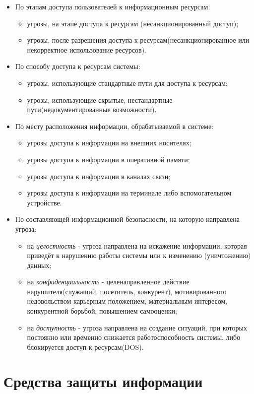 \documentclass{article}
\begin{document}
\begin{itemize}
\begin{itemize}
\end{itemize}
\item По этапам доступа пользователей к информационным ресурсам:
\begin{itemize}
\item угрозы, на этапе доступа к ресурсам (несанкционированный доступ);
\item угрозы, после разрешения доступа к ресурсам(несанкционированное или некорректное использование ресурсов).
\end{itemize}
\item По способу доступа к ресурсам системы:
\begin{itemize}
\item угрозы, использующие стандартные пути для доступа к ресурсам;
\item угрозы, использующие скрытые, нестандартные пути(недокументированные возможности).
\end{itemize}
\item По месту расположения информации, обрабатываемой в системе:
\begin{itemize}
\item угрозы доступа к информации на внешних носителях;
\item угрозы доступа к информации в оперативной памяти;
\item угрозы доступа к информации в каналах связи;
\item угрозы доступа к информации на терминале либо вспомогательном устройстве.
\end{itemize}
\item По составляющей информационной безопасности, на которую направлена угроза:
\begin{itemize}
\item на \textit{целостность} - угроза направлена на искажение информации, которая приведёт к нарушению работы системы или к изменению (уничтожению) данных;
\item на \textit{конфиденциальность} - целенаправленное действие нарушителя(служащий, посетитель, конкурент), мотивированного недовольством карьерным положением, материальным интересом, конкурентной борьбой, повышением самооценки;
\item на \textit{доступность} - угроза направлена на создание ситуаций, при которых постоянно или временно снижается работоспособность системы, либо блокируется доступ к ресурсам(DOS).
\end{itemize}
\end{itemize}
\section{ Средства защиты информации}
\end{document}

